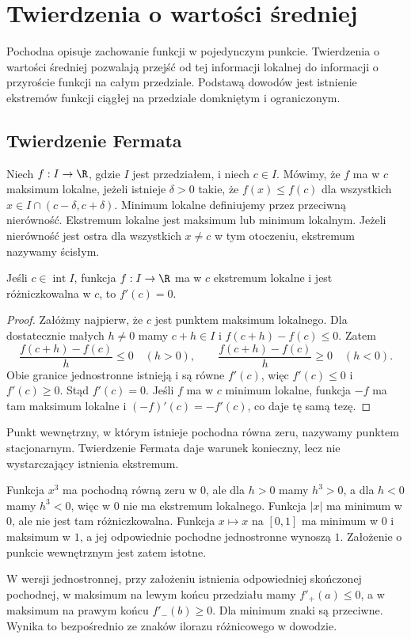 \chapter{Twierdzenia o wartości średniej}
\label{ma1:ch:mean-value-theorems}

Pochodna opisuje zachowanie funkcji w pojedynczym punkcie. Twierdzenia o wartości średniej pozwalają przejść od tej informacji lokalnej do informacji o przyroście funkcji na całym przedziale. Podstawą dowodów jest istnienie ekstremów funkcji ciągłej na przedziale domkniętym i ograniczonym.

\section{Twierdzenie Fermata}
\begin{definicja}
\label{ma1:def:local-extremum}
Niech $f:I\to\R$, gdzie $I$ jest przedziałem, i niech $c\in I$. Mówimy, że $f$ ma w $c$ maksimum lokalne, jeżeli istnieje $\delta>0$ takie, że $f(x)\le f(c)$ dla wszystkich $x\in I\cap(c-\delta,c+\delta)$. Minimum lokalne definiujemy przez przeciwną nierówność. Ekstremum lokalne jest maksimum lub minimum lokalnym. Jeżeli nierówność jest ostra dla wszystkich $x\ne c$ w tym otoczeniu, ekstremum nazywamy ścisłym.
\end{definicja}
\begin{twierdzenie}[Fermata]
\label{ma1:thm:fermat}
Jeśli $c\in\operatorname{int}I$, funkcja $f:I\to\R$ ma w $c$ ekstremum lokalne i jest różniczkowalna w $c$, to $f'(c)=0$.
\end{twierdzenie}
\begin{proof}
Załóżmy najpierw, że $c$ jest punktem maksimum lokalnego. Dla dostatecznie małych $h\ne0$ mamy $c+h\in I$ i $f(c+h)-f(c)\le0$. Zatem
\[
 \frac{f(c+h)-f(c)}h\le0 \quad(h>0),\qquad
 \frac{f(c+h)-f(c)}h\ge0 \quad(h<0).
\]
Obie granice jednostronne istnieją i są równe $f'(c)$, więc $f'(c)\le0$ i $f'(c)\ge0$. Stąd $f'(c)=0$. Jeśli $f$ ma w $c$ minimum lokalne, funkcja $-f$ ma tam maksimum lokalne i $(-f)'(c)=-f'(c)$, co daje tę samą tezę.
\end{proof}
Punkt wewnętrzny, w którym istnieje pochodna równa zeru, nazywamy punktem stacjonarnym. Twierdzenie Fermata daje warunek konieczny, lecz nie wystarczający istnienia ekstremum.
\begin{przyklad}
\label{ma1:ex:fermat-assumptions}
Funkcja $x^3$ ma pochodną równą zeru w $0$, ale dla $h>0$ mamy $h^3>0$, a dla $h<0$ mamy $h^3<0$, więc w $0$ nie ma ekstremum lokalnego. Funkcja $|x|$ ma minimum w $0$, ale nie jest tam różniczkowalna. Funkcja $x\mapsto x$ na $[0,1]$ ma minimum w $0$ i maksimum w $1$, a jej odpowiednie pochodne jednostronne wynoszą $1$. Założenie o punkcie wewnętrznym jest zatem istotne.
\end{przyklad}
W wersji jednostronnej, przy założeniu istnienia odpowiedniej skończonej pochodnej, w maksimum na lewym końcu przedziału mamy $f'_+(a)\le0$, a w maksimum na prawym końcu $f'_-(b)\ge0$. Dla minimum znaki są przeciwne. Wynika to bezpośrednio ze znaków ilorazu różnicowego w dowodzie.

